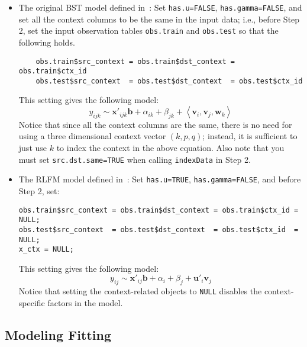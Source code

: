 \documentclass[10pt]{article}
\begin{document}
\begin{itemize}
\item The original BST model defined in~\cite{bst:kdd11}: Set {\tt has.u=FALSE}, {\tt has.gamma=FALSE}, and set all the context columns to be the same in the input data; i.e., before Step 2, set the input observation tables {\tt obs.train} and {\tt obs.test} so that the following holds.
{\small\begin{verbatim}
    obs.train$src_context = obs.train$dst_context = obs.train$ctx_id
    obs.test$src_context  = obs.test$dst_context  = obs.test$ctx_id
\end{verbatim}}
This setting gives the following model:
$$
y_{ijk} \sim \bm{x}'_{ijk} \bm{b} + \alpha_{ik} + \beta_{jk} + \left<\bm{v}_i, \bm{v}_j, \bm{w}_k\right>
$$
Notice that since all the context columns are the same, there is no need for using a three dimensional context vector $(k,p,q)$; instead, it is sufficient to just use $k$ to index the context in the above equation.  Also note that you must set {\tt src.dst.same=TRUE} when calling {\tt indexData} in Step 2.
\item The RLFM model defined in~\cite{rlfm:kdd09}: Set {\tt has.u=TRUE}, {\tt has.gamma=FALSE}, and before Step 2, set:
{\small\begin{verbatim}
obs.train$src_context = obs.train$dst_context = obs.train$ctx_id = NULL;
obs.test$src_context  = obs.test$dst_context  = obs.test$ctx_id  = NULL;
x_ctx = NULL;
\end{verbatim}}
\noindent This setting gives the following model:
$$
y_{ij} \sim \bm{x}'_{ij} \bm{b} + \alpha_{i} + \beta_{j} + \bm{u}'_i \bm{v}_j
$$
Notice that setting the context-related objects to {\tt NULL} disables the context-specific factors in the model.
\end{itemize}

\subsection{Modeling Fitting}
\end{document}
